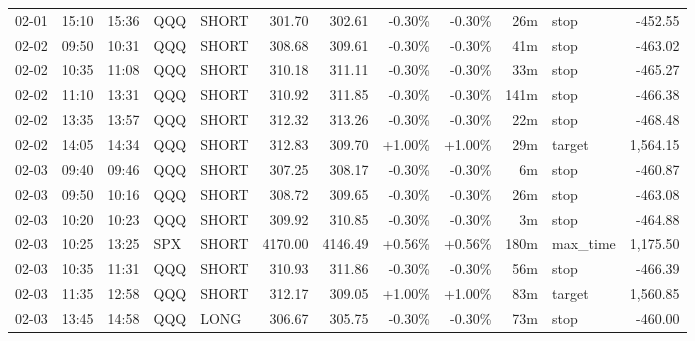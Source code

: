 \documentclass[11pt,a4paper,twoside]{article}
\begin{document}
\begin{center}
\begin{longtable}{>{\color{txtmain}}l l l l l r r r r r >{\color{txtmain}}l r}
02-01 & 15:10 & 15:36 & QQQ & SHORT & 301.70 & 302.61 & \textcolor{lossred}{-0.30\%} & \textcolor{lossred}{-0.30\%} & 26m & stop & \textcolor{lossred}{-452.55} \\
02-02 & 09:50 & 10:31 & QQQ & SHORT & 308.68 & 309.61 & \textcolor{lossred}{-0.30\%} & \textcolor{lossred}{-0.30\%} & 41m & stop & \textcolor{lossred}{-463.02} \\
02-02 & 10:35 & 11:08 & QQQ & SHORT & 310.18 & 311.11 & \textcolor{lossred}{-0.30\%} & \textcolor{lossred}{-0.30\%} & 33m & stop & \textcolor{lossred}{-465.27} \\
02-02 & 11:10 & 13:31 & QQQ & SHORT & 310.92 & 311.85 & \textcolor{lossred}{-0.30\%} & \textcolor{lossred}{-0.30\%} & 141m & stop & \textcolor{lossred}{-466.38} \\
02-02 & 13:35 & 13:57 & QQQ & SHORT & 312.32 & 313.26 & \textcolor{lossred}{-0.30\%} & \textcolor{lossred}{-0.30\%} & 22m & stop & \textcolor{lossred}{-468.48} \\
02-02 & 14:05 & 14:34 & QQQ & SHORT & 312.83 & 309.70 & \textcolor{wingreen}{+1.00\%} & \textcolor{wingreen}{+1.00\%} & 29m & target & \textcolor{wingreen}{1,564.15} \\
02-03 & 09:40 & 09:46 & QQQ & SHORT & 307.25 & 308.17 & \textcolor{lossred}{-0.30\%} & \textcolor{lossred}{-0.30\%} & 6m & stop & \textcolor{lossred}{-460.87} \\
02-03 & 09:50 & 10:16 & QQQ & SHORT & 308.72 & 309.65 & \textcolor{lossred}{-0.30\%} & \textcolor{lossred}{-0.30\%} & 26m & stop & \textcolor{lossred}{-463.08} \\
02-03 & 10:20 & 10:23 & QQQ & SHORT & 309.92 & 310.85 & \textcolor{lossred}{-0.30\%} & \textcolor{lossred}{-0.30\%} & 3m & stop & \textcolor{lossred}{-464.88} \\
02-03 & 10:25 & 13:25 & SPX & SHORT & 4170.00 & 4146.49 & \textcolor{wingreen}{+0.56\%} & \textcolor{wingreen}{+0.56\%} & 180m & max\_time & \textcolor{wingreen}{1,175.50} \\
02-03 & 10:35 & 11:31 & QQQ & SHORT & 310.93 & 311.86 & \textcolor{lossred}{-0.30\%} & \textcolor{lossred}{-0.30\%} & 56m & stop & \textcolor{lossred}{-466.39} \\
02-03 & 11:35 & 12:58 & QQQ & SHORT & 312.17 & 309.05 & \textcolor{wingreen}{+1.00\%} & \textcolor{wingreen}{+1.00\%} & 83m & target & \textcolor{wingreen}{1,560.85} \\
02-03 & 13:45 & 14:58 & QQQ & LONG & 306.67 & 305.75 & \textcolor{lossred}{-0.30\%} & \textcolor{lossred}{-0.30\%} & 73m & stop & \textcolor{lossred}{-460.00} \\

\end{longtable}
\end{center}
\end{document}
